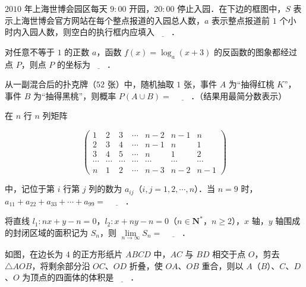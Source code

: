 \begingroup
\renewenvironment{question}{\Needspace{0.5\textheight}}{}
\begin{question}
$2010$ 年上海世博会园区每天 $9:00$ 开园，$20:00$ 停止入园．在下边的框图中，$S$ 表示上海世博会官方网站在每个整点报道的入园总人数，$a$ 表示整点报道前 $1$ 个小时内入园人数，则空白的执行框内应填入$\underline{\qquad}$．
\nopagebreak[4]
\begin{center}\end{center}
\nopagebreak[4]
\end{question}
\endgroup
\begin{question}
对任意不等于 $1$ 的正数 $a$，函数 $f(x)=\log_a(x+3)$ 的反函数的图象都经过点 $P$，则点 $P$ 的坐标为$\underline{\qquad}$．

\end{question}
\begin{question}
从一副混合后的扑克牌（$52$ 张）中，随机抽取 $1$ 张，事件 $A$ 为“抽得红桃 $K$”，事件 $B$ 为“抽得黑桃”，则概率 $P(A\cup B)=$ $\underline{\qquad}$．（结果用最简分数表示）

\end{question}
\begin{question}
在 $n$ 行 $n$ 列矩阵

\nopagebreak[4]
\[\begin{pmatrix}
1&2&3&\cdots&n-2&n-1&n\\
2&3&4&\cdots&n-1&n&1\\
3&4&5&\cdots&n&1&2\\
\cdots&\cdots&\cdots&\cdots&\cdots&\cdots&\cdots\\
n&1&2&\cdots&n-3&n-2&n-1
\end{pmatrix}\]

中，记位于第 $i$ 行第 $j$ 列的数为 $a_{ij}$（$i,j=1,2,\cdots,n$）．当 $n=9$ 时，$a_{11}+a_{22}+a_{33}+\cdots+a_{99}=$ $\underline{\qquad}$．

\end{question}
\begin{question}
将直线 $l_1:nx+y-n=0$，$l_2:x+ny-n=0$（$n\in\mathbf N^*$，$n\geqslant2$），$x$ 轴，$y$ 轴围成的封闭区域的面积记为 $S_n$，则 $\lim\limits_{n\to\infty}S_n=$ $\underline{\qquad}$．

\Needspace{0.4\textheight}
\end{question}
\begingroup
\renewenvironment{question}{\Needspace{0.5\textheight}}{}
\begin{question}
如图，在边长为 $4$ 的正方形纸片 $ABCD$ 中，$AC$ 与 $BD$ 相交于点 $O$，剪去 $\triangle AOB$，将剩余部分沿 $OC$、$OD$ 折叠，使 $OA$、$OB$ 重合，则以 $A$（$B$）、$C$、$D$、$O$ 为顶点的四面体的体积是$\underline{\qquad}$．
\nopagebreak[4]
\begin{center}\end{center}
\nopagebreak[4]
\Needspace{0.4\textheight}
\end{question}
